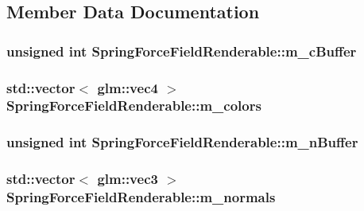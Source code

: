 \subsection{Member Data Documentation}
\hypertarget{classSpringForceFieldRenderable_ac970d8fbdb56983f09680e3c505999f6}{
\subsubsection[{m\+\_\+c\+Buffer}]{\setlength{\rightskip}{0pt plus 5cm}unsigned int Spring\+Force\+Field\+Renderable\+::m\+\_\+c\+Buffer\hspace{0.3cm}{\ttfamily [private]}}}\label{classSpringForceFieldRenderable_ac970d8fbdb56983f09680e3c505999f6}
\hypertarget{classSpringForceFieldRenderable_aabc44da4bf82b70a101dfffdd1ee2713}{
\subsubsection[{m\+\_\+colors}]{\setlength{\rightskip}{0pt plus 5cm}std\+::vector$<$ glm\+::vec4 $>$ Spring\+Force\+Field\+Renderable\+::m\+\_\+colors\hspace{0.3cm}{\ttfamily [private]}}}\label{classSpringForceFieldRenderable_aabc44da4bf82b70a101dfffdd1ee2713}
\hypertarget{classSpringForceFieldRenderable_ab52ba645d894920eba38ed71799d52e3}{
\subsubsection[{m\+\_\+n\+Buffer}]{\setlength{\rightskip}{0pt plus 5cm}unsigned int Spring\+Force\+Field\+Renderable\+::m\+\_\+n\+Buffer\hspace{0.3cm}{\ttfamily [private]}}}\label{classSpringForceFieldRenderable_ab52ba645d894920eba38ed71799d52e3}
\hypertarget{classSpringForceFieldRenderable_a82d45ea9543e4308a909b2890ae7d9b0}{
\subsubsection[{m\+\_\+normals}]{\setlength{\rightskip}{0pt plus 5cm}std\+::vector$<$ glm\+::vec3 $>$ Spring\+Force\+Field\+Renderable\+::m\+\_\+normals\hspace{0.3cm}{\ttfamily [private]}}}\label{classSpringForceFieldRenderable_a82d45ea9543e4308a909b2890ae7d9b0}
